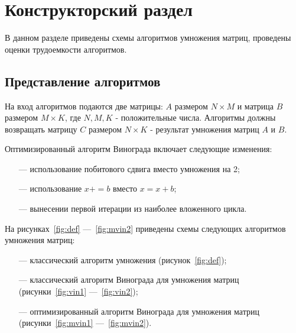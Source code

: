 \chapter{Конструкторский раздел}
В данном разделе приведены схемы алгоритмов умножения матриц, проведены оценки трудоемкости алгоритмов.

\section{Представление алгоритмов}

На вход алгоритмов подаются две матрицы: $A$ размером $N\times M$ и матрица $B$ размером $M\times K$, где $N, M, K$ - положительные числа. Алгоритмы должны возвращать матрицу $C$ размером $N\times K$ - результат умножения матриц $A$ и $B$.

Оптимизированный алгоритм Винограда включает следующие изменения:
\begin{itemize}
    \item[---] использование побитового сдвига вместо умножения на 2;
    \item[---] использование $x += b$ вместо $x = x + b$;
    \item[---] вынесении первой итерации из наиболее вложенного цикла.
\end{itemize}

На рисунках~\ref{fig:def} ---~\ref{fig:mvin2} приведены схемы следующих алгоритмов умножения матриц:
\begin{itemize}
    \item[---] классический алгоритм умножения (рисунок~\ref{fig:def});
    \item[---] классический алгоритм Винограда для умножения матриц (рисунки~\ref{fig:vin1} ---~\ref{fig:vin2});
    \item[---] оптимизированный алгоритм Винограда для умножения матриц (рисунки~\ref{fig:mvin1} ---~\ref{fig:mvin2}).
\end{itemize}

